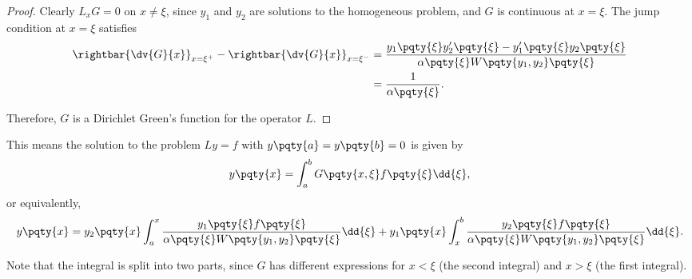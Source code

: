 \begin{proof}
    Clearly \(L_x G = 0\) on \(x \neq \xi\), since \(y_1\) and \(y_2\) are solutions to the homogeneous problem, and \(G\) is continuous at \(x = \xi\). The jump condition at \(x = \xi\) satisfies
    \begin{subequations}
        \begin{align}
            \rightbar{\dv{G}{x}}_{x = \xi^+} - \rightbar{\dv{G}{x}}_{x = \xi^-} &= \frac{y_1 \pqty{\xi} y_2' \pqty{\xi} - y_1' \pqty{\xi} y_2 \pqty{\xi}}{\alpha\pqty{\xi} W\pqty{y_1, y_2} \pqty{\xi}} \\
            &= \frac{1}{\alpha\pqty{\xi}}.
        \end{align}
    \end{subequations}

    Therefore, \(G\) is a Dirichlet Green's function for the operator \(L\).
\end{proof}

This means the solution to the problem \(Ly = f\) with \(y\pqty{a} = y\pqty{b} = 0\) is given by
\begin{equation}
    y\pqty{x} = \int_{a}^{b} G\pqty{x, \xi} f\pqty{\xi} \dd{\xi},
\end{equation}
or equivalently,
\begin{equation}
    y\pqty{x} = y_2 \pqty{x} \int_{a}^{x} \frac{y_1\pqty{\xi} f\pqty{\xi}}{\alpha\pqty{\xi} W\pqty{y_1, y_2} \pqty{\xi}} \dd{\xi} + y_1 \pqty{x} \int_{x}^{b} \frac{y_2\pqty{\xi} f\pqty{\xi}}{\alpha\pqty{\xi} W\pqty{y_1, y_2} \pqty{\xi}} \dd{\xi}.
\end{equation}

Note that the integral is split into two parts, since \(G\) has different expressions for \(x < \xi\) (the second integral) and \(x > \xi\) (the first integral).

